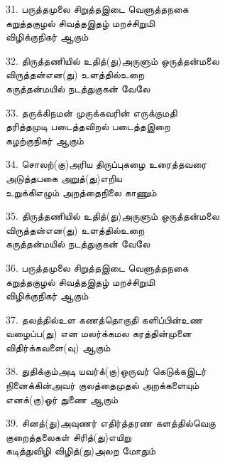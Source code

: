 31. பருத்தமுலை சிறுத்தஇடை வெளுத்தநகை\\
        கறுத்தகுழல் சிவத்தஇதழ் மறச்சிறுமி\\
        விழிக்குநிகர் ஆகும் \thiru



32. திருத்தணியில் உதித்(து)அருளும் ஒருத்தன்மலை\\
        விருத்தன்என(து) உளத்தில்உறை\\
        கருத்தன்மயில் நடத்துகுகன் வேலே \thiru



33. தருக்கிநமன் முருக்கவரின் எருக்குமதி\\
         தரித்தமுடி படைத்தவிறல் படைத்தஇறை\\
         கழற்குநிகர் ஆகும் \thiru



34. சொலற்(கு)அரிய திருப்புகழை உரைத்தவரை\\
         அடுத்தபகை அறுத்(து)எறிய\\
         உறுக்கிஎழும் அறத்தைநிலை காணும் \thiru



35. திருத்தணியில் உதித்(து)அருளும் ஒருத்தன்மலை\\
        விருத்தன்என(து) உளத்தில்உறை\\
        கருத்தன்மயில் நடத்துகுகன் வேலே \thiru



36. பருத்தமுலை சிறுத்தஇடை வெளுத்தநகை\\
        கறுத்தகுழல் சிவத்தஇதழ் மறச்சிறுமி\\
        விழிக்குநிகர் ஆகும் \thiru



37. தலத்தில்உள கணத்தொகுதி களிப்பின்உண\\
         வழைப்ப(து) என மலர்க்கமல கரத்தின்முனை\\
         விதிர்க்கவளை(வு) ஆகும் \thiru



38. துதிக்கும்அடி யவர்க்(கு)ஒருவர் கெடுக்கஇடர்\\
         நினைக்கின்அவர் குலத்தைமுதல் அறக்களையும்\\
         எனக்(கு)ஓர் துணை ஆகும் \thiru



39. சினத்(து)அவுணர் எதிர்த்தரண களத்தில்வெகு\\
         குறைத்தலைகள் சிரித்(து)எயிறு\\
         கடித்துவிழி விழித்(து)அலற மோதும் \thiru



